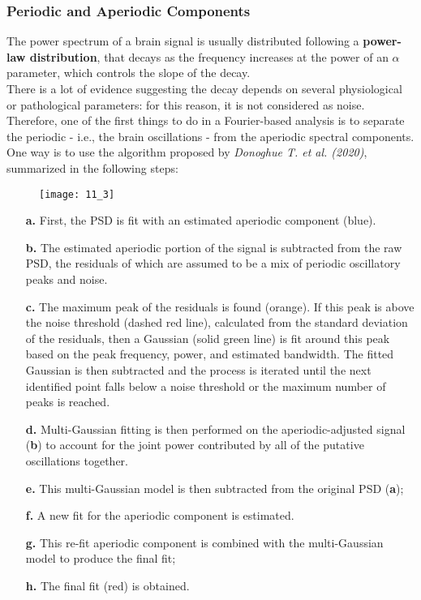 \subsubsection{Periodic and Aperiodic Components}
The power spectrum of a brain signal is usually distributed following a \textbf{power-law distribution},
that decays as the frequency increases at the power of an \(\alpha\) parameter, which controls the slope
of the decay.\\
There is a lot of evidence suggesting the decay depends on several physiological or pathological parameters:
for this reason, it is not considered as noise.\\
Therefore, one of the first things to do in a Fourier-based analysis is to separate the periodic
- i.e., the brain oscillations - from the aperiodic spectral components. One way is to use the
algorithm proposed by \textit{Donoghue T. et al. (2020)}, summarized in the following steps:
\begin{figure}[H]
    \texttt{[image: 11\_3]}
    \centering
\end{figure}
\begin{itemize}
    \item[\textbf{a.}] First, the PSD is fit with an estimated aperiodic component (blue).
    \item[\textbf{b.}] The estimated aperiodic portion of the signal is subtracted from the raw PSD, the
        residuals of which are assumed to be a mix of periodic oscillatory peaks and noise.
    \item[\textbf{c.}] The maximum peak of the residuals is found (orange). If this peak is above the noise
        threshold (dashed red line), calculated from the standard deviation of the residuals, then a Gaussian
        (solid green line) is fit around this peak based on the peak frequency, power, and estimated bandwidth.
        The fitted Gaussian is then subtracted and the process is iterated until the next identified point
        falls below a noise threshold or the maximum number of peaks is reached.
    \item[\textbf{d.}] Multi-Gaussian fitting is then performed on the aperiodic-adjusted signal (\textbf{b})
        to account for the joint power contributed by all of the putative oscillations together.
    \item[\textbf{e.}] This multi-Gaussian model is then subtracted from the original PSD (\textbf{a});
    \item[\textbf{f.}] A new fit for the aperiodic component is estimated.
    \item[\textbf{g.}] This re-fit aperiodic component is combined with the multi-Gaussian model to produce
        the final fit;
    \item[\textbf{h.}] The final fit (red) is obtained.
\end{itemize}
